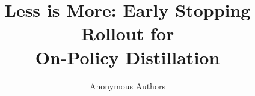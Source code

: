 \documentclass{article}
\title{Less is More: Early Stopping Rollout for \\ On-Policy Distillation}
\author{%
  Anonymous Authors\\
}
\newcommand{\method}{ESR}
\newcommand{\methodfull}{Early Stopping Rollout}
\begin{document}
\maketitle

\begin{abstract}

\end{abstract}
\end{document}
